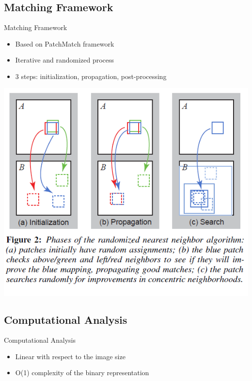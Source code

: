 %
%
\subsection{Matching Framework}
\begin{frame}{Matching Framework}

\begin{itemize}
\item Based on PatchMatch framework
\item Iterative and randomized process
\item 3 steps: initialization, propagation, post-processing
\end{itemize}
\includegraphics[scale=0.25]{pictures/fig1_patchmatch}
\end{frame}

\subsection{Computational Analysis}
\begin{frame}{Computational Analysis}
\begin{itemize}
\item Linear with respect to the image size
\item O(1) complexity of the binary representation
\end{itemize}
\end{frame}


